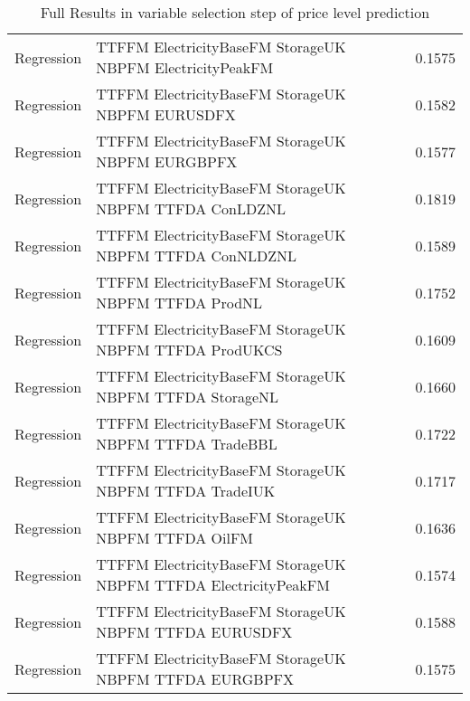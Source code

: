 \begin{table}[h!]
\begin{adjustbox}{max width=\textwidth}
\begin{tabular}{llr}
  Regression & TTFFM ElectricityBaseFM StorageUK NBPFM ElectricityPeakFM & 0.1575 \\ 
  Regression & TTFFM ElectricityBaseFM StorageUK NBPFM EURUSDFX & 0.1582 \\ 
  Regression & TTFFM ElectricityBaseFM StorageUK NBPFM EURGBPFX & 0.1577 \\ 
  Regression & TTFFM ElectricityBaseFM StorageUK NBPFM TTFDA ConLDZNL & 0.1819 \\ 
  Regression & TTFFM ElectricityBaseFM StorageUK NBPFM TTFDA ConNLDZNL & 0.1589 \\ 
  Regression & TTFFM ElectricityBaseFM StorageUK NBPFM TTFDA ProdNL & 0.1752 \\ 
  Regression & TTFFM ElectricityBaseFM StorageUK NBPFM TTFDA ProdUKCS & 0.1609 \\ 
  Regression & TTFFM ElectricityBaseFM StorageUK NBPFM TTFDA StorageNL & 0.1660 \\ 
  Regression & TTFFM ElectricityBaseFM StorageUK NBPFM TTFDA TradeBBL & 0.1722 \\ 
  Regression & TTFFM ElectricityBaseFM StorageUK NBPFM TTFDA TradeIUK & 0.1717 \\ 
  Regression & TTFFM ElectricityBaseFM StorageUK NBPFM TTFDA OilFM & 0.1636 \\ 
  Regression & TTFFM ElectricityBaseFM StorageUK NBPFM TTFDA ElectricityPeakFM & 0.1574 \\ 
  Regression & TTFFM ElectricityBaseFM StorageUK NBPFM TTFDA EURUSDFX & 0.1588 \\ 
  Regression & TTFFM ElectricityBaseFM StorageUK NBPFM TTFDA EURGBPFX & 0.1575 \\ 
   \hline
 \end{tabular}
\end{adjustbox}
\caption{Full Results in variable selection step of price level prediction} 
\label{tab:level.var.selection.full}
\end{table}

